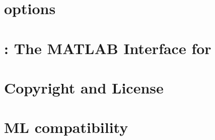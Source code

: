 \documentclass[pdf,12pt,report]{SANDreport}
\begin{document}
    \chapter{\muelu{} options} \label{sec:options}
    

    \chapter{\muemex: The MATLAB Interface for \muelu} \label{sec:muemex}
    



    \clearpage
    \providecommand*{\phantomsection}{}
    \phantomsection
    
    


    \appendix
    \chapter{Copyright and License}
    

    \chapter{ML compatibility}
    



    
\end{document}
